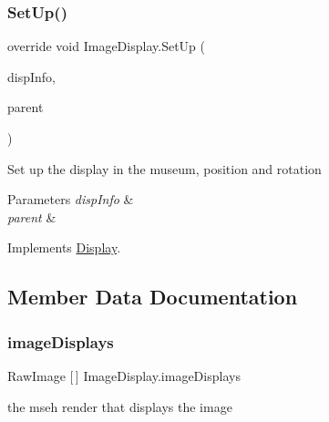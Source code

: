 \subsubsection{\texorpdfstring{Set\+Up()}{SetUp()}}
{\footnotesize\ttfamily override void Image\+Display.\+Set\+Up (\begin{DoxyParamCaption}\item[{\mbox{\hyperlink{class_museum_display_info}{Museum\+Display\+Info}}}]{disp\+Info,  }\item[{Game\+Object}]{parent }\end{DoxyParamCaption})\hspace{0.3cm}{\ttfamily [virtual]}}



Set up the display in the museum, position and rotation 


\begin{DoxyParams}{Parameters}
{\em disp\+Info} & \\
\hline
{\em parent} & \\
\hline
\end{DoxyParams}


Implements \mbox{\hyperlink{class_display_a57325251fbeac943cd48520e50f0bec4}{Display}}.



\subsection{Member Data Documentation}
\mbox{\label{class_image_display_a3f64480a2ecdc17ac43e0db335ca8a4c}} 
\subsubsection{\texorpdfstring{image\+Displays}{imageDisplays}}
{\footnotesize\ttfamily Raw\+Image \mbox{[}$\,$\mbox{]} Image\+Display.\+image\+Displays\hspace{0.3cm}{\ttfamily [private]}}



the mseh render that displays the image 

\mbox{\label{class_image_display_a8ecd7f162065170c3f5cbcf906b11873}} 
